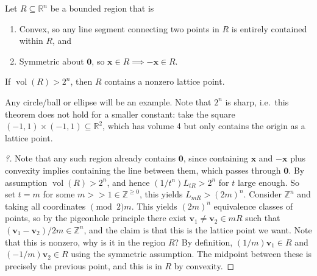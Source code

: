 \begin{theorem}

Let \(R \subseteq {\mathbb{R}}^n\) be a bounded region that is

\begin{enumerate}
\def\labelenumi{\arabic{enumi}.}
\item
  Convex, so any line segment connecting two points in \(R\) is entirely
  contained within \(R\), and
\item
  Symmetric about \(\mathbf{0}\), so
  \(\mathbf{x}\in R\implies -\mathbf{x}\in R\).
\end{enumerate}

If \(\operatorname{vol}(R) > 2^n\), then \(R\) contains a nonzero
lattice point.

\end{theorem}

\begin{remark}

Any circle/ball or ellipse will be an example. Note that \(2^n\) is
sharp, i.e.~this theorem does not hold for a smaller constant: take the
square \((-1, 1) \times(-1, 1) \subseteq {\mathbb{R}}^2\), which has
volume 4 but only contains the origin as a lattice point.

\end{remark}

\begin{proof}[?]

Note that any such region already contains \(\mathbf{0}\), since
containing \(\mathbf{x}\) and \(-\mathbf{x}\) plus convexity implies
containing the line between them, which passes through \(\mathbf{0}\).
By assumption \(\operatorname{vol}(R) > 2^n\), and hence
\((1/t^n)L_{tR} > 2^n\) for \(t\) large enough. So set \(t=m\) for some
\(m>> 1\in {\mathbb{Z}}^{\geq 0}\), this yields \(L_{mR} > (2m)^n\).
Consider \({\mathbb{Z}}^n\) and taking all coordinates \(\pmod 2m\).
This yields \((2m)^n\) equivalence classes of points, so by the
pigeonhole principle there exist
\(\mathbf{v}_1 \neq \mathbf{v}_2 \in mR\) such that
\((\mathbf{v}_1 - \mathbf{v}_2)/2m \in {\mathbb{Z}}^n\), and the claim
is that this is the lattice point we want. Note that this is nonzero,
why is it in the region \(R\)? By definition,
\((1/m)\mathbf{v}_1 \in R\) and \((-1/m)\mathbf{v}_2 \in R\) using the
symmetric assumption. The midpoint between these is precisely the
previous point, and this is in \(R\) by convexity.

\end{proof}

